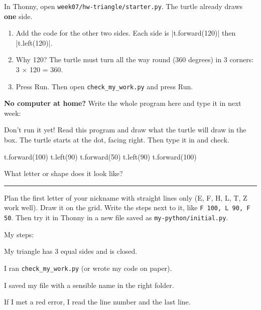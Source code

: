 \namedateline

\begin{core}
In Thonny, open \texttt{week07/hw-triangle/starter.py}. The turtle already draws \textbf{one} side.
\begin{enumerate}[leftmargin=1.4em,itemsep=1pt]
  \item Add the code for the other two sides. Each side is \py|t.forward(120)| then \py|t.left(120)|.
  \item Why 120? The turtle must turn all the way round (360 degrees) in 3 corners: 3 × 120 = 360.
  \item Press Run. Then open \texttt{check\_my\_work.py} and press Run.
\end{enumerate}
\textbf{No computer at home?} Write the whole program here and type it in next week:
\end{core}

\begin{challenge}
Don't run it yet! Read this program and draw what the turtle will draw in the box. The turtle starts at the dot, facing right. Then type it in and check.
\begin{pycode}
t.forward(100)
t.left(90)
t.forward(50)
t.left(90)
t.forward(100)
\end{pycode}
What letter or shape does it look like? \rule{5cm}{0.4pt}
\end{challenge}

\begin{creative}[My initial]
Plan the first letter of your nickname with straight lines only (E, F, H, L, T, Z work well). Draw it on the grid. Write the steps next to it, like \texttt{F 100, L 90, F 50}. Then try it in Thonny in a new file saved as \texttt{my-python/initial.py}.
\par\medskip
{}\hfill
\begin{minipage}[b]{0.38\linewidth}
My steps:
\end{minipage}
\end{creative}

\begin{selfcheck}
  \item My triangle has 3 equal sides and is closed.
  \item I ran \texttt{check\_my\_work.py} (or wrote my code on paper).
  \item I saved my file with a sensible name in the right folder.
  \item If I met a red error, I read the line number and the last line.
\end{selfcheck}
